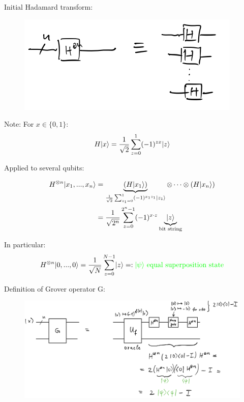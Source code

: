 Initial Hadamard transform: \\

\begin{figure}[H]
    \centering
    \includegraphics[scale=0.5]{chapters/res/initial-hadamard-transform.png}
\end{figure}
Note: For $x \in \{0, 1\}$:
\begin{equation}
    H \lvert x\rangle = \frac{1}{\sqrt{2}} \sum_{z = 0}^1 (-1)^{z x} \lvert z\rangle 
\end{equation}

Applied to several qubits:

\begin{align}
    H^{\otimes n} \lvert x_1, ..., x_n\rangle 
        &= \underbrace{(H\lvert x_1\rangle)}_{\frac{1}{\sqrt{2}} \sum_{z_1 = 0}^1 (-1)^{x_1 z_1} \lvert z_1\rangle}
            \otimes \cdots \otimes (H \lvert x_n\rangle) \\ 
        &= \frac{1}{\sqrt{2^n}}  \sum_{z = 0}^{2^n - 1} (-1)^{x \cdot z} \underbrace{\lvert z\rangle}_{\text{bit string}}
\end{align}

In particular: 
\begin{equation}
    H^{\otimes n} \lvert0, ..., 0\rangle = \frac{1}{\sqrt{N}} \sum_{z = 0}^{N - 1} \lvert z\rangle =: {\color{green} \lvert\psi\rangle \text{ equal superposition state}}
\end{equation}

Definition of Grover operator G:

\begin{figure}[H]
    \centering
    \includegraphics[scale=0.4]{chapters/res/grover-operation-circuit.png}
\end{figure}

